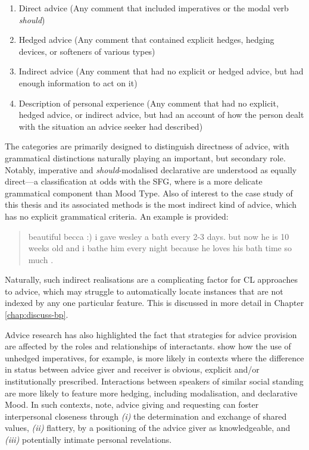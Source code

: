 \begin{enumerate}\small
\item Direct advice (Any comment that included imperatives or the modal verb \emph{should})
\item Hedged advice (Any comment that contained explicit hedges, hedging devices, or softeners of various types)
\item Indirect advice (Any comment that had no explicit or hedged advice, but had enough information to act on it)
\item Description of personal experience (Any comment that had no explicit, hedged advice, or indirect advice, but had an account of how the person dealt with the situation an advice seeker had described) \cite[adapted from][p.~7]{kouper_pragmatics_2010}
\end{enumerate}
%
The categories are primarily designed to distinguish directness of advice, with grammatical distinctions naturally playing an important, but secondary role. Notably, imperative and \emph{should}-modalised declarative are understood as equally direct---a classification at odds with the \gls{SFG}, where  is a more delicate grammatical component than Mood Type. Also of interest to the case study of this thesis and its associated methods is the most indirect kind of advice, which has no explicit grammatical criteria. An example is provided:

\begin{quote}\singlespacing\small
beautiful becca :) i gave wesley a bath every 2-3 days. but now he is 10 weeks old and i bathe him every night because he loves his bath time so much  \textcite[p.~13]{kouper_pragmatics_2010}.
\end{quote}
%
Naturally, such indirect realisations are a complicating factor for \gls{CL} approaches to advice, which may struggle to automatically locate instances that are not indexed by any one particular  feature. This is discussed in more detail in Chapter \ref{chap:discuss-bp}.

Advice research has also highlighted the fact that strategies for advice provision are affected by the roles and relationships of interactants. \textcite{decapua_`if_1995} show how the use of unhedged imperatives, for example, is more likely in contexts where the difference in status between advice giver and receiver is obvious, explicit and\slash or institutionally prescribed. Interactions between speakers of similar social standing are more likely to feature more hedging, including modalisation, and declarative Mood. In such contexts, \citeauthor{decapua_`if_1995} note, advice giving and requesting can foster interpersonal closeness through \emph{(i)} the determination and exchange of shared values, \emph{(ii)} flattery, by a positioning of the advice giver as knowledgeable, and \emph{(iii)} potentially intimate personal revelations.

